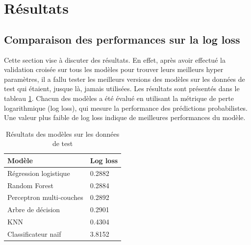 \documentclass[12pt]{article}
\begin{document}
\newpage
\section{Résultats}
\label{sec:results}
\subsection{Comparaison des performances sur la log loss}
Cette section vise à discuter des résultats.
En effet, après avoir effectué la validation croisée sur tous les modèles pour trouver leurs meilleurs hyper paramètres, il a fallu tester les meilleurs versions des modèles sur les données de test qui étaient, jusque là, jamais utilisées.
Les résultats sont présentés dans le tableau \ref{tab:results}.
Chacun des modèles a été évalué en utilisant la métrique de perte logarithmique (log loss), qui mesure la performance des prédictions probabilistes. 
Une valeur plus faible de log loss indique de meilleures performances du modèle.

\begin{table}[htp]
    \centering
    \begin{tabular}{|l|l|}
    \hline
    \textbf{Modèle}          & \textbf{Log loss} \\ \hline
    Régression logistique    & 0.2882          \\ \hline
    Random Forest            & 0.2884          \\ \hline
    Perceptron multi-couches & 0.2892          \\ \hline
    Arbre de décision        & 0.2901         \\ \hline
    KNN                      & 0.4304         \\ \hline
    Classificateur naïf      & 3.8152          \\ \hline
    \end{tabular}
    \caption{Résultats des modèles sur les données de test}
    \label{tab:results}
\end{table}
\end{document}
